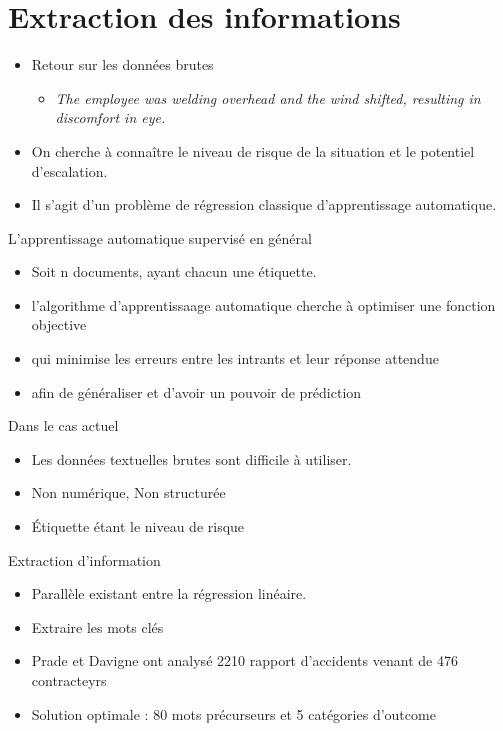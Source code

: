 \section{Extraction des informations}

	\begin{frame}
		\begin{itemize}
		\item Retour sur les données brutes
			\begin{itemize}
				\item \textit{The employee was welding overhead and the wind shifted, resulting in discomfort in eye.}\\
			\end{itemize}
		\item On cherche à connaître le niveau de risque de la situation et le potentiel d'escalation.
		\item Il s'agit d'un problème de régression classique d'apprentissage automatique.
		\end{itemize}			
	\end{frame}


\begin{frame}
	L'apprentissage automatique supervisé en général
	\begin{itemize}
		\item Soit n documents, ayant chacun une étiquette.
		\item l'algorithme d'apprentissaage automatique cherche à optimiser une fonction objective
		\item qui minimise les erreurs entre les intrants et leur réponse attendue
		\item afin de généraliser et d'avoir un pouvoir de prédiction
	\end{itemize}			
	
	\bigskip
	
	Dans le cas actuel
	\begin{itemize}
		\item Les données textuelles brutes sont difficile à utiliser.
		\item Non numérique, Non structurée 
		\item Étiquette étant le niveau de risque 	
	\end{itemize}			
\end{frame}


\begin{frame}
	Extraction d'information
	\begin{itemize}
		\item Parallèle existant entre la régression linéaire.
		\item Extraire les mots clés
		\item Prade et Davigne ont analysé 2210 rapport d'accidents venant de 476 contracteyrs
		\item Solution optimale : 80 mots précurseurs et 5 catégories d'outcome
	\end{itemize}			
\end{frame}


